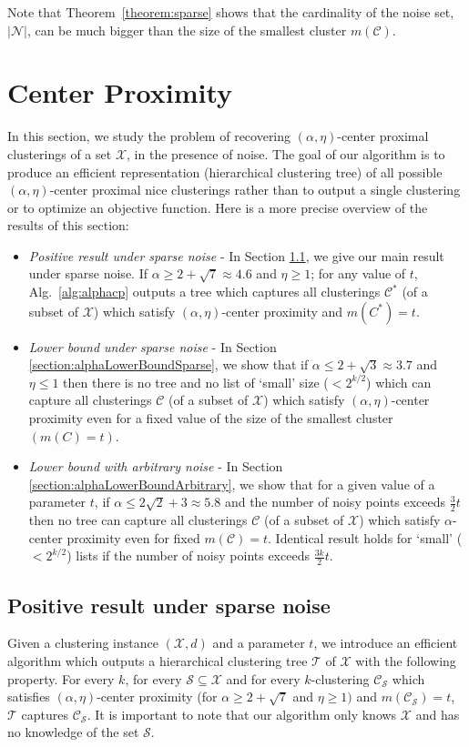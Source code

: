\documentclass[orivec]{llncs}
\newcommand{\mc}{\mathcal}
\begin{document}
\noindent Note that Theorem~\ref{theorem:sparse} shows that the cardinality of the noise set, $|\mc N|$, can be much bigger than the size of the smallest cluster $m(\mc C)$. 

\section{Center Proximity}
\label{section:cp}

In this section, we study the problem of recovering $(\alpha, \eta)$-center proximal clusterings of a set $\mc X$, in the presence of noise. The goal of our algorithm is to produce an efficient representation (hierarchical clustering tree) of all possible $(\alpha, \eta)$-center proximal nice clusterings rather than to output a single clustering or to optimize an objective function. Here is a more precise overview of the results of this section: 
\begin{itemize}[nolistsep,noitemsep,leftmargin=*]
\item  {\it Positive result under sparse noise} - In Section \ref{section:positiveResultSparseNoise}, we give our main result under sparse noise. If $\alpha \ge 2 + \sqrt{7} \approx 4.6$ and $\eta \ge 1$; for any value of $t$, Alg.~\ref{alg:alphacp} outputs a tree which captures all clusterings $\mc C^*$ (of a subset of $\mc X$) which satisfy $(\alpha, \eta)$-center proximity and $m(C^*)=t$.
\item  {\it Lower bound under sparse noise} - In Section \ref{section:alphaLowerBoundSparse}, we show that if $\alpha \le 2 + \sqrt{3} \approx 3.7$ and $\eta \le 1$ then there is no tree and no list of `small' size ($< 2^{k/2}$) which can capture all clusterings $\mc C$ (of a subset of $\mc X$) which satisfy $(\alpha, \eta)$-center proximity even for a fixed value of the size of the smallest cluster $(m(C) = t)$.
\item {\it Lower bound with arbitrary noise} - In Section \ref{section:alphaLowerBoundArbitrary}, we show that for a given value of a parameter $t$, if $\alpha \le 2\sqrt{2} + 3 \approx 5.8$ and the number of noisy points exceeds $\frac{3}{2}t$ then no tree can capture all clusterings $\mc C$ (of a subset of $\mc X$) which satisfy $\alpha$-center proximity even for fixed $m(\mc C) = t$. Identical result holds for `small' ($<2^{k/2}$) lists if the number of noisy points exceeds $\frac{3k}{2}t$.
\end{itemize} 

\subsection{Positive result under sparse noise}
\label{section:positiveResultSparseNoise}
Given a clustering instance $(\mc X, d)$ and a parameter $t$, we introduce an efficient algorithm which outputs a hierarchical clustering tree $\mc T$ of $\mc X$ with the following property. For every $k$, for every $\mc S \subseteq \mc X$ and for every $k$-clustering $\mc C_{\mc S}$ which satisfies $(\alpha, \eta)$-center proximity (for $\alpha \ge 2 + \sqrt{7}$ and $ \eta \ge 1)$ and $m(\mc C_{\mc S}) = t$, $\mc T$ captures $\mc C_{\mc S}$. It is important to note that our algorithm only knows $\mc X$ and has no knowledge of the set $\mc S$.
\end{document}
